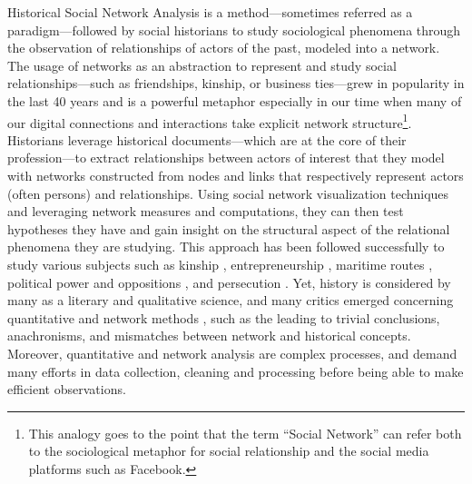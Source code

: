 Historical Social Network Analysis is a method---sometimes referred as a paradigm---followed by social historians to study sociological phenomena through the observation of relationships of actors of the past, modeled into a network.
The usage of networks as an abstraction to represent and study social relationships---such as friendships, kinship, or business ties---grew in popularity in the last 40 years \cite{freemanDevelopmentSocialNetwork2004, tabassumSocialNetworkAnalysis2018} and is a powerful metaphor especially in our time when many of our digital connections and interactions take explicit network structure\footnote{This analogy goes to the point that the term ``Social Network'' can refer both to the sociological metaphor for social relationship and the social media platforms such as Facebook.}.
Historians leverage historical documents---which are at the core of their profession\cite{langloisIntroductionAuxEtudes2014}---to extract relationships between actors of interest that they model with networks constructed from nodes and links that respectively represent actors (often persons) and relationships.
Using social network visualization techniques and leveraging network measures and computations, they can then test hypotheses they have and gain insight on the structural aspect of the relational phenomena they are studying\cite{wetherellHistoricalSocialNetwork1998, kerschbaumerPowerNetworksProspects2015}.
This approach has been followed successfully to study various subjects such as kinship \cite{hambergerKinshipNetworkAnalysis2011}, entrepreneurship \cite{rubio-mondejarWomenEntrepreneursFamily2022}, maritime routes \cite{larsonThomasTartaronMaritime2014}, political power \cite{padgettRobustActionRise1993} and oppositions \cite{osaSolidarityContentionNetworks2003}, and persecution \cite{merckléPeutonModéliserPersécution2018}.
Yet, history is considered by many as a literary and qualitative science, and many critics emerged concerning quantitative and network methods \cite{lepetitHistoireQuantitativeDeux1989, karila-cohenNouvellesCuisinesHistoire2018, lemercier12FormalNetwork2015}, such as the leading to trivial conclusions, anachronisms, and mismatches between network and historical concepts.
Moreover, quantitative and network analysis are complex processes, and demand many efforts in data collection, cleaning and processing before being able to make efficient observations.

